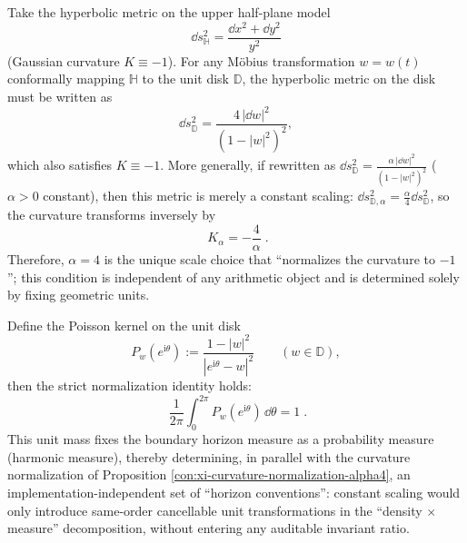 \begin{proposition}\label{con:xi-curvature-normalization-alpha4}
Take the hyperbolic metric on the upper half-plane model
\[
\dd s_{\mathbb{H}}^{2}=\frac{\dd x^{2}+\dd y^{2}}{y^{2}}
\]
(Gaussian curvature \(K\equiv -1\)).
For any M\"obius transformation \(w=w(t)\) conformally mapping \(\mathbb{H}\) to the unit disk \(\mathbb{D}\), the hyperbolic metric on the disk must be written as
\[
\dd s_{\mathbb{D}}^{2}=\frac{4\,|\dd w|^{2}}{(1-|w|^{2})^{2}},
\]
which also satisfies \(K\equiv -1\).
More generally, if rewritten as
\(
\dd s_{\mathbb{D}}^{2}=\frac{\alpha\,|\dd w|^{2}}{(1-|w|^{2})^{2}}
\)
(\(\alpha>0\) constant), then this metric is merely a constant scaling: \(\dd s_{\mathbb{D},\alpha}^{2}=\frac{\alpha}{4}\dd s_{\mathbb{D}}^{2}\), so the curvature transforms inversely by
\[
\boxed{\;K_{\alpha}=-\frac{4}{\alpha}\; }.
\]
Therefore, \(\alpha=4\) is the unique scale choice that ``normalizes the curvature to \(-1\)''; this condition is independent of any arithmetic object and is determined solely by fixing geometric units.
\end{proposition}

\begin{proposition}\label{con:xi-poisson-kernel-unit-mass-normalization}
Define the Poisson kernel on the unit disk
\[
P_{w}(e^{\mathrm{i}\theta})
:=\frac{1-|w|^{2}}{|e^{\mathrm{i}\theta}-w|^{2}}
\qquad(w\in\mathbb{D}),
\]
then the strict normalization identity holds:
\[
\boxed{\;
\frac{1}{2\pi}\int_{0}^{2\pi}P_{w}(e^{\mathrm{i}\theta})\,\dd\theta=1\; }.
\]
This unit mass fixes the boundary horizon measure as a probability measure (harmonic measure), thereby determining, in parallel with the curvature normalization of Proposition \ref{con:xi-curvature-normalization-alpha4}, an implementation-independent set of ``horizon conventions'':
constant scaling would only introduce same-order cancellable unit transformations in the ``density \(\times\) measure'' decomposition, without entering any auditable invariant ratio.
\end{proposition}

